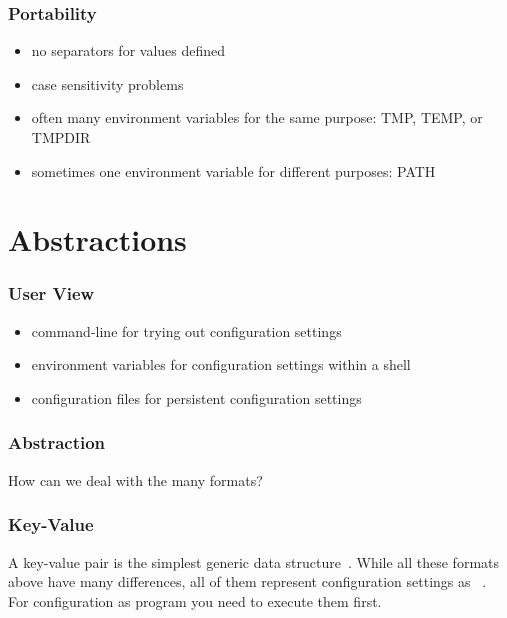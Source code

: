 \begin{frame}
	\frametitle{Portability}
	\begin{itemize}
	\item no separators for values defined
	\item case sensitivity problems
	\item often many environment variables for the same purpose: TMP, TEMP, or TMPDIR
	\item sometimes one environment variable for different purposes: PATH
	\end{itemize}
\end{frame}





\section{Abstractions}

\begin{frame}
	\frametitle{User View}
	\begin{itemize}
	\item command-line for trying out configuration settings
	\item environment variables for configuration settings within a shell
	\item configuration files for persistent configuration settings
	\end{itemize}
\end{frame}

\begin{frame}
	\frametitle{Abstraction}
	\reqLegacy*

	\vspace{1cm}

	How can we deal with the many formats?
\end{frame}

\begin{frame}
	\frametitle{Key-Value}
	A key-value pair is the simplest generic data structure~\cite{strang2004context}.
	While all these formats above have many differences, all of them represent configuration settings as ~\cite{jin2014configurations,rabkin2011static,xu2013blame,lathia2013open}.
\\[1cm]

For configuration as program you need to execute them first.
\end{frame}

